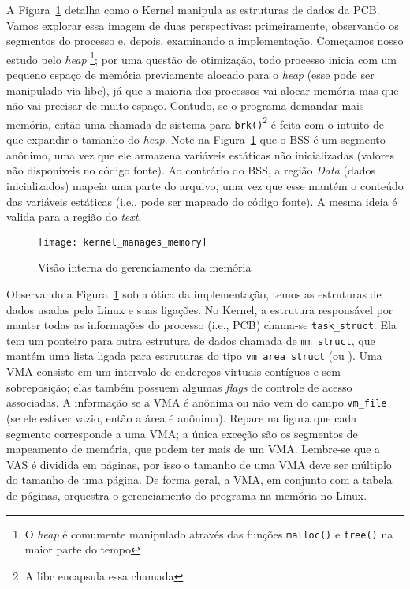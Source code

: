 A Figura~\ref{fig:kernel_manages_memory} detalha
como o Kernel manipula as estruturas de dados da PCB. Vamos explorar essa
imagem de duas perspectivas: primeiramente, observando os segmentos do processo
e, depois, examinando a implementação. Começamos nosso estudo pelo \textit{heap}
\footnote{O \emph{heap} é comumente manipulado através das funções \texttt{malloc()} e
\texttt{free()} na maior parte do tempo}; por uma questão de otimização, todo
processo inicia com um pequeno espaço de memória previamente alocado para o \textit{heap}
(esse pode ser manipulado via libc), já que a maioria dos
processos vai alocar memória mas que não vai precisar de muito espaço.
Contudo, se o programa demandar mais memória, então uma chamada de sistema para
\texttt{brk()}\footnote{A libc encapsula essa chamada} é feita com o intuito de
que expandir o tamanho do \textit{heap}. Note na
Figura~\ref{fig:kernel_manages_memory} que o BSS é um segmento anônimo, uma vez
que ele armazena variáveis estáticas não inicializadas (valores não disponíveis
no código fonte). Ao contrário do BSS, a região \emph{Data} (dados
inicializados) mapeia uma parte do arquivo, uma vez que esse mantém o conteúdo
das variáveis estáticas (i.e., pode ser mapeado do código fonte). A mesma ideia
é valida para a região do \textit{text}.

\begin{figure}[!h]
  \centering
  \texttt{[image: kernel\_manages\_memory]}
  \caption{Visão interna do gerenciamento da memória~\citep{kernel_manage_mem}}
  \label{fig:kernel_manages_memory}
\end{figure}

Observando a Figura~\ref{fig:kernel_manages_memory} sob a ótica
da implementação, temos as estruturas de dados usadas pelo Linux e
suas ligações. No Kernel, a estrutura responsável por manter todas as
informações do processo (i.e., PCB) chama-se \texttt{task\_struct}. Ela tem um
ponteiro para outra estrutura de dados chamada de \texttt{mm\_struct}, que
mantém uma lista ligada para estruturas do tipo \texttt{vm\_area\_struct} (ou
). Uma VMA consiste em um intervalo de
endereços virtuais contíguos e sem sobreposição; elas também possuem algumas
\textit{flags} de controle de acesso associadas. A informação se a VMA é
anônima ou não vem do campo \texttt{vm\_file} (se ele estiver vazio, então a
área é anônima). Repare na figura que cada segmento corresponde a uma VMA; a
única exceção são os segmentos de mapeamento de memória, que podem ter mais de um
VMA. Lembre-se que a VAS é dividida em páginas, por isso o tamanho de uma VMA
deve ser múltiplo do tamanho de uma página. De forma geral, a VMA, em conjunto com a
tabela de páginas, orquestra o gerenciamento do programa na memória no Linux.

